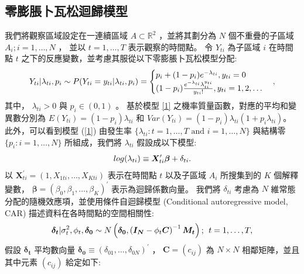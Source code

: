 \documentclass[12pt,a4paper]{article}
\begin{document}
\begin{CJK}{UTF8}{bkai}
\subsection{零膨脹卜瓦松迴歸模型}\label{sec:2.1}
\fontsize{12}{20pt}\selectfont
我們將觀察區域設定在一連續區域 $A\subset\mathbb{R}^2$ ，並將其劃分為 $N$ 個不重疊的子區域 $A_i; i=1,\dots,N$ ，
並以 $t=1,\dots,T$ 表示觀察的時間點。
令 $Y_{ti}$ 為子區域 $i$ 在時間點 $t$ 之下的反應變數，並考慮其服從以下零膨脹卜瓦松模型分配:
 \begin{equation}
 \setlength\abovedisplayskip{20pt}
 \setlength\belowdisplayskip{20pt}
  Y_{ti}|\lambda_{ti},p_i \sim P(Y_{ti} = y_{ti}|\lambda_{ti},p_i) =
 \begin{cases}
  p_i + (1-p_i) e^{-\lambda_{ti}},y_{ti} = 0 \\
  (1-p_i) \frac{e^{-\lambda_{ti}}\lambda_{ti}^{y_{ti}}}{y_{ti}!},y_{ti} = 1,2,\dots
 \end{cases},
 \label{1}
 \end{equation}
\noindent
其中， $\lambda_{ti}>0$ 與 $p_i\in(0,1)$ 。
基於模型  \eqref{1} 之機率質量函數，對應的平均和變異數分別為  $E\left(Y_{ti}\right)=\left(1-p_i\right)\lambda_{ti}$ 和 $Var\left(Y_{ti}\right)=\left(1-p_i\right)\lambda_{ti}\left(1+p_i\lambda_{ti}\right)$。
此外，可以看到模型 (\ref{1}) 由發生率 $\{\lambda_{ti} : t=1,\dots,T \mbox{ and } i=1,\dots,N\}$ 與結構零 $\{p_i : i=1,\dots,N\}$ 所組成，我們將 $\lambda_{ti}$ 假設成以下模型:
 \begin{equation}
 \setlength\abovedisplayskip{25pt}
 \setlength\belowdisplayskip{25pt}
 log(\lambda_{ti}) \equiv \bm{X}_{ti}^\prime \bm{\beta} + \delta_{ti} .
 \label{2}
 \end{equation}
\noindent
以 $\bm{X}_{ti}^\prime = (1,X_{1ti},\ldots,X_{Kti})$ 表示在時間點 $t$ 以及子區域 $A_i$ 所搜集到的 $K$ 個解釋變數， $\bm{\beta} = \left(\beta_{0},\beta_{1},\dots,\beta_{K} \right)^\prime$ 表示為迴歸係數向量。
我們將 $\delta_{ti}$ 考慮為 $N$ 維常態分配的隨機效應項，並使用條件自迴歸模型 (Conditional autoregressive model, CAR) 描述資料在各時間點的空間相關性:
 \begin{equation}
 \setlength\abovedisplayskip{25pt}
 \setlength\belowdisplayskip{25pt}
  \bm{\delta_{t}}|\sigma_t^2,\phi_t,\bm{\delta_0} \sim N \left( \bm{\delta_0},\left(\bm{I_N}-\phi_t\bm{C}\right)^{-1} \bm{M_t} \right);\:\: t=1,\ldots,T,
 \label{3}
 \end{equation}
\noindent
假設 $\bm{\delta_{t}}$ 平均數向量 $\bm{\delta_0} \equiv \left(\delta_{01},\dots,\delta_{0N}\right)^\prime$ ， $\bm{C} = (c_{ij})$ 為 $N \times N$ 相鄰矩陣，並且其中元素 $(c_{ij})$ 給定如下:

\end{CJK}
\end{document}
